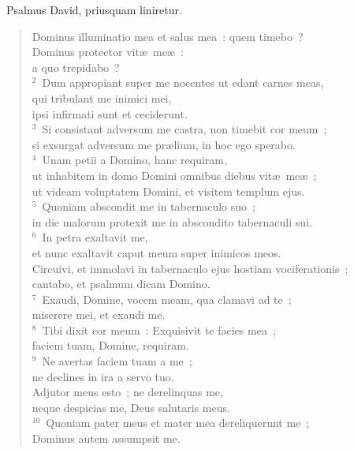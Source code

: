 ~\lettrine[lines=10,image=true,loversize=0.05,lraise=-0.03]{P}{}salmus David, priusquam liniretur. \begin{flushleft}\begin{verse}\vspace{6pt}Dominus illuminatio mea et salus mea~: quem timebo~?\\ Dominus protector vit\ae\ me\ae~:\\ a quo trepidabo~?\\
${}^{2}$~Dum appropiant super me nocentes ut edant carnes meas,\\ qui tribulant me inimici mei,\\ ipsi infirmati sunt et ceciderunt.\\
${}^{3}$~Si consistant adversum me castra, non timebit cor meum~;\\ si exsurgat adversum me pr\ae lium, in hoc ego sperabo.\\
${}^{4}$~Unam petii a Domino, hanc requiram,\\ ut inhabitem in domo Domini omnibus diebus vit\ae\ me\ae~;\\ ut videam voluptatem Domini, et visitem templum ejus.\\
${}^{5}$~Quoniam abscondit me in tabernaculo suo~;\\ in die malorum protexit me in abscondito tabernaculi sui.\\
${}^{6}$~In petra exaltavit me,\\ et nunc exaltavit caput meum super inimicos meos.\\ Circuivi, et immolavi in tabernaculo ejus hostiam vociferationis~;\\ cantabo, et psalmum dicam Domino.\\
${}^{7}$~Exaudi, Domine, vocem meam, qua clamavi ad te~;\\ miserere mei, et exaudi me.\\
${}^{8}$~Tibi dixit cor meum~: Exquisivit te facies mea~;\\ faciem tuam, Domine, requiram.\\
${}^{9}$~Ne avertas faciem tuam a me~;\\ ne declines in ira a servo tuo.\\ Adjutor meus esto~; ne derelinquas me,\\ neque despicias me, Deus salutaris meus.\\
${}^{10}$~Quoniam pater meus et mater mea dereliquerunt me~;\\ Dominus autem assumpsit me.\\

\end{verse}
\end{flushleft}
